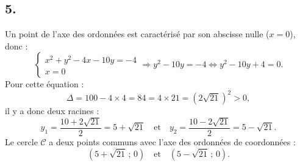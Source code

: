 \documentclass[10pt]{article}
\begin{document}
\subsection*{5.}

Un point de l'axe des ordonnées est caractérisé par son abscisse nulle (\(x = 0\)), donc :
\[
\begin{cases}
x^2 + y^2 - 4x - 10y = -4 \\
x = 0
\end{cases}
\Rightarrow y^2 - 10y = -4
\iff y^2 - 10y + 4 = 0.
\]
Pour cette équation :
\[
\Delta = 100 - 4 \times 4 = 84 = 4 \times 21 = (2\sqrt{21})^2 > 0,
\]
il y a donc deux racines :
\[
y_1 = \frac{10 + 2\sqrt{21}}{2} = 5 + \sqrt{21} \quad \text{et} \quad y_2 = \frac{10 - 2\sqrt{21}}{2} = 5 - \sqrt{21}.
\]
Le cercle \(\mathcal{C}\) a deux points communs avec l'axe des ordonnées de coordonnées :
\[
(5 + \sqrt{21} \,;\, 0) \quad \text{et} \quad (5 - \sqrt{21} \,;\, 0).
\]
\end{document}
